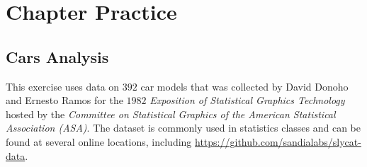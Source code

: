 \section{Chapter Practice}

\subsection{Cars Analysis}

This exercise uses data on $ 392 $ car models that was collected by David Donoho and Ernesto Ramos for the $ 1982 $ \textit{Exposition of Statistical Graphics Technology} hosted by the \textit{Committee on Statistical Graphics of the American Statistical Association (ASA)}. The dataset is commonly used in statistics classes and can be found at several online locations, including \url{https://github.com/sandialabs/slycat-data}.

